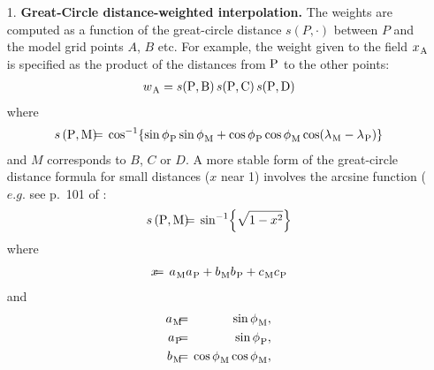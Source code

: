 \documentclass[../main/NEMO_manual]{subfiles}
\begin{document}
\begin{enumerate}

\item[1.] {\bf Great-Circle distance-weighted interpolation.}
  The weights are computed as a function of the great-circle distance $s(P, \cdot)$ between $P$ and
  the model grid points $A$, $B$ etc.
  For example, the weight given to the field ${x_{}}_{\rm A}$ is specified as the product of the distances
  from ${\rm P}$ to the other points:
  \begin{align*}
    {w_{}}_{\rm A} = s({\rm P}, {\rm B}) \, s({\rm P}, {\rm C}) \, s({\rm P}, {\rm D})
  \end{align*}
  where 
  \begin{align*}
    s\left ({\rm P}, {\rm M} \right ) 
     & \hspace{-2mm} = \hspace{-2mm} & 
      \cos^{-1} \! \left\{ 
               \sin {\phi_{}}_{\rm P} \sin {\phi_{}}_{\rm M}
             + \cos {\phi_{}}_{\rm P} \cos {\phi_{}}_{\rm M} 
               \cos ({\lambda_{}}_{\rm M} - {\lambda_{}}_{\rm P}) 
                   \right\}
   \end{align*}
   and $M$ corresponds to $B$, $C$ or $D$.
   A more stable form of the great-circle distance formula for small distances ($x$ near 1)
   involves the arcsine function ($e.g.$ see p.~101 of \citet{Daley_Barker_Bk01}:
   \begin{align*}
     s\left( {\rm P}, {\rm M} \right) & \hspace{-2mm} = \hspace{-2mm} & \sin^{-1} \! \left\{ \sqrt{ 1 - x^2 } \right\}
   \end{align*}
   where
   \begin{align*}
     x & \hspace{-2mm} = \hspace{-2mm} &
                                         {a_{}}_{\rm M} {a_{}}_{\rm P} + {b_{}}_{\rm M} {b_{}}_{\rm P} + {c_{}}_{\rm M} {c_{}}_{\rm P}
   \end{align*}
   and 
   \begin{align*}
      {a_{}}_{\rm M} & \hspace{-2mm} = \hspace{-2mm} & \sin {\phi_{}}_{\rm M}, \\
      {a_{}}_{\rm P} & \hspace{-2mm} = \hspace{-2mm} & \sin {\phi_{}}_{\rm P}, \\
      {b_{}}_{\rm M} & \hspace{-2mm} = \hspace{-2mm} & \cos {\phi_{}}_{\rm M} \cos {\phi_{}}_{\rm M}, \\

\end{align*}
\end{enumerate}
\end{document}
